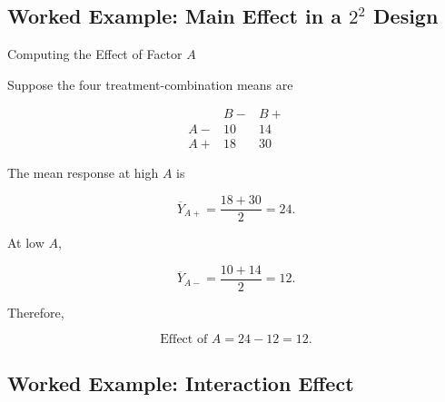 \subsection{Worked Example: Main Effect in a \(2^2\) Design}
\label{subsec:worked-main-effect-2x2}

\begin{workedexamplebox}{Computing the Effect of Factor \(A\)}

Suppose the four treatment-combination means are

\[
\begin{array}{c|cc}
&
B-
&
B+
\\
\hline
A-
&
10
&
14
\\
A+
&
18
&
30
\end{array}
\]

The mean response at high \(A\) is

\[
\overline{Y}_{A+}
=
\frac{
18+30
}{2}
=
24.
\]

At low \(A\),

\[
\overline{Y}_{A-}
=
\frac{
10+14
}{2}
=
12.
\]

Therefore,

\begin{answerbox}
\[
\boxed{
\text{Effect of }A
=
24-12
=
12.
}
\]
\end{answerbox}

\end{workedexamplebox}

\subsection{Worked Example: Interaction Effect}
\label{subsec:worked-interaction-effect-2x2}

